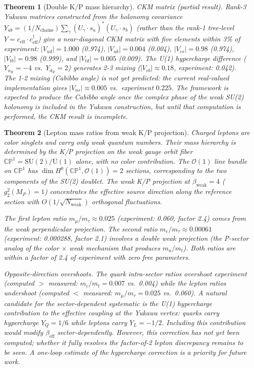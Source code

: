 \documentclass[12pt,a4paper]{article}
\newtheorem{theorem}{Theorem}
\begin{document}
\begin{theorem}[Double K/P mass hierarchy]
\emph{CKM matrix (partial result).}  Rank-3 Yukawa matrices constructed from the holonomy covariance $Y_{ab} = (1/N_{\mathrm{chains}}) \sum_\gamma (U_\gamma \cdot s_a)^* (U_\gamma \cdot s_b)$ (rather than the rank-1 tree-level $Y = c_{\mathrm{eff}} \cdot c_{\mathrm{eff}}^\dagger$) give a near-diagonal CKM matrix with five elements within 3\% of experiment: $|V_{ud}| = 1.000$ (0.974), $|V_{ub}| = 0.004$ (0.004), $|V_{cs}| = 0.98$ (0.974), $|V_{tb}| = 0.98$ (0.999), and $|V_{td}| = 0.005$ (0.009).  The U(1) hypercharge difference ($Y_{u_R} = -4$ vs.\ $Y_{d_R} = 2$) generates 2-3 mixing ($|V_{cb}| \approx 0.18$, experiment: 0.042).  The 1-2 mixing (Cabibbo angle) is not yet predicted: the current real-valued implementation gives $|V_{us}| \approx 0.005$ vs.\ experiment $0.225$.  The framework is expected to produce the Cabibbo angle once the complex phase of the weak SU(2) holonomy is included in the Yukawa construction, but until that computation is performed, the CKM result is incomplete.
\end{theorem}

\begin{theorem}[Lepton mass ratios from weak K/P projection]
\label{thm:lepton_mass}
Charged leptons are color singlets and carry only weak quantum numbers.  Their mass hierarchy is determined by the K/P projection on the weak gauge orbit fiber $\mathbb{CP}^1 = \mathrm{SU}(2)/\mathrm{U}(1)$ alone, with no color contribution.  The $\mathcal{O}(1)$ line bundle on $\mathbb{CP}^1$ has $\dim H^0(\mathbb{CP}^1, \mathcal{O}(1)) = 2$ sections, corresponding to the two components of the SU(2) doublet.  The weak K/P projection at $\beta_{\mathrm{weak}} = 4$ ($g_2^2(M_P) = 1$) concentrates the effective source direction along the reference section with $O(1/\sqrt{N_{\mathrm{weak}}})$ orthogonal fluctuations.

The first lepton ratio $m_\mu/m_\tau \approx 0.025$ (experiment: 0.060, factor 2.4) comes from the weak perpendicular projection.  The second ratio $m_e/m_\tau \approx 0.00061$ (experiment: 0.000288, factor 2.1) involves a double weak projection (the P-sector analog of the color $\times$ weak mechanism that produces $m_u/m_t$).  Both ratios are within a factor of 2.4 of experiment with zero free parameters.

\emph{Opposite-direction overshoots.}  The quark intra-sector ratios overshoot experiment (computed $>$ measured: $m_c/m_t = 0.007$ vs.\ 0.004) while the lepton ratios undershoot (computed $<$ measured: $m_\mu/m_\tau = 0.025$ vs.\ 0.060).  A natural candidate for the sector-dependent systematic is the U(1) hypercharge contribution to the effective coupling at the Yukawa vertex: quarks carry hypercharge $Y_Q = 1/6$ while leptons carry $Y_L = -1/2$.  Including this contribution would modify $\beta_{\mathrm{eff}}$ sector-dependently.  However, this correction has not yet been computed; whether it fully resolves the factor-of-2 lepton discrepancy remains to be seen.  A one-loop estimate of the hypercharge correction is a priority for future work.
\end{theorem}
\end{document}
